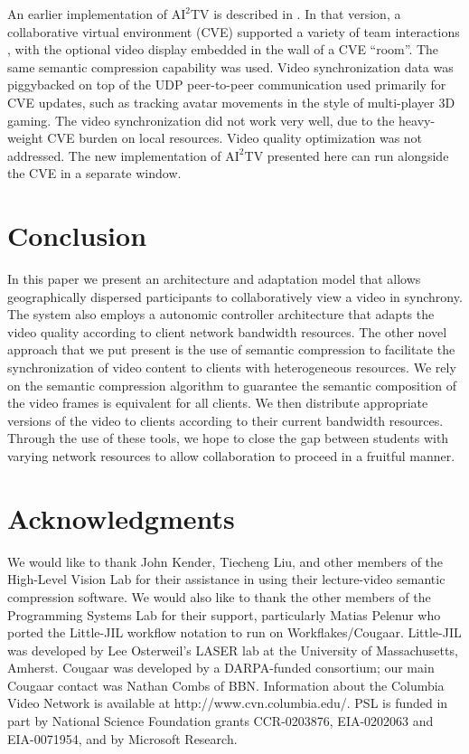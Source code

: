 \documentclass{sig-alternate}
\begin{document}
An earlier implementation of $\mathrm{AI}^2$TV is described in
\cite{VECTORS}.  In that version, a collaborative virtual environment
(CVE) supported a variety of team interactions \cite{CHIME}, with the
optional video display embedded in the wall of a CVE ``room''.  The
same semantic compression capability was used. Video synchronization
data was piggybacked on top of the UDP peer-to-peer communication used
primarily for CVE updates, such as tracking avatar movements in the
style of multi-player 3D gaming.  The video synchronization did not
work very well, due to the heavy-weight CVE burden on local
resources. Video quality optimization was not addressed.  The new
implementation of $\mathrm{AI}^2$TV presented here can run alongside
the CVE in a separate window.

\section{Conclusion}

In this paper we present an architecture and adaptation model that
allows geographically dispersed participants to collaboratively view a
video in synchrony.  The system also employs a autonomic controller
architecture that adapts the video quality according to client network
bandwidth resources.  The other novel approach that we put present is
the use of semantic compression to facilitate the synchronization of
video content to clients with heterogeneous resources.  We rely on the
semantic compression algorithm to guarantee the semantic composition
of the video frames is equivalent for all clients.  We then distribute
appropriate versions of the video to clients according to their
current bandwidth resources.  Through the use of these tools, we hope
to close the gap between students with varying network resources to
allow collaboration to proceed in a fruitful manner.

\section{Acknowledgments}
We would like to thank John Kender, Tiecheng Liu, and other members of
the High-Level Vision Lab for their assistance in using their
lecture-video semantic compression software.  We would also like to
thank the other members of the Programming Systems Lab for their
support, particularly Matias Pelenur who ported the Little-JIL
workflow notation to run on Workflakes/Cougaar.  Little-JIL was
developed by Lee Osterweil's LASER lab at the University of
Massachusetts, Amherst. Cougaar was developed by a DARPA-funded
consortium; our main Cougaar contact was Nathan Combs of BBN.
Information about the Columbia Video Network is available at
http://www.cvn.columbia.edu/. PSL is funded in part by National
Science Foundation grants CCR-0203876, EIA-0202063 and EIA-0071954,
and by Microsoft Research.
\end{document}
